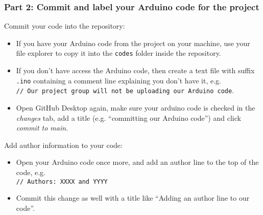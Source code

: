 \documentclass[9pt,handout]{beamer}
\begin{document}
\begin{frame}
  \frametitle{Part 2: Commit and label your Arduino code for the project}
  Commit your code into the repository:
  \begin{itemize}
    \item If you have your Arduino code from the project on your machine, use your file explorer to copy it into the \texttt{codes} folder inside the repository.
    \item If you don't have access the Arduino code, then create a text file with suffix \texttt{.ino} containing a comment line explaining you don't have it, e.g. \\ \texttt{// Our project group will not be uploading our Arduino code}.
    \item Open GitHub Desktop again, make sure your arduino code is checked in the \emph{changes} tab, add a title (e.g. ``committing our Arduino code'') and click \emph{commit to main}.
  \end{itemize}
  Add author information to your code:
  \begin{itemize}
    \item Open your Arduino code once more, and add an author line to the top of the code, e.g. \\ \texttt{// Authors: XXXX and YYYY}
    \item Commit this change as well with a title like ``Adding an author line to our code''.
  \end{itemize}
\end{frame}
%
\end{document}
